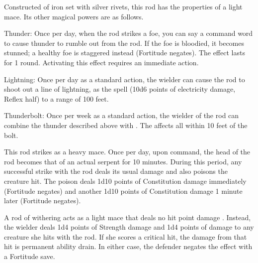 
 Constructed of iron set with silver rivets, this rod has the properties of a  light mace. Its other magical powers are as follows.
\begin{itemize*}
\item Thunder: Once per day, when the rod strikes a foe, you can say a command word to cause thunder to rumble out from the rod. If the foe is bloodied, it becomes stunned; a healthy foe is staggered instead (Fortitude negates). The effect lasts for 1 round. Activating this effect requires an immediate action.
\item Lightning: Once per day as a standard action, the wielder can cause the rod to shoot out a line of lightning, as the  spell (10d6 points of electricity damage, Reflex half) to a range of 100 feet.
\item Thunderbolt: Once per week as a standard action, the wielder of the rod can combine the thunder described above with . The  affects all within 10 feet of the bolt.
\end{itemize*}


 This rod strikes as a  heavy mace. Once per day, upon command, the head of the rod becomes that of an actual serpent for 10 minutes. During this period, any successful strike with the rod deals its usual damage and also poisons the creature hit. The poison deals 1d10 points of Constitution damage immediately (Fortitude negates) and another 1d10 points of Constitution damage 1 minute later (Fortitude negates).


 A rod of withering acts as a  light mace that deals no hit point damage . Instead, the wielder deals 1d4 points of Strength damage and 1d4 points of  damage to any creature she hits with the rod. If she scores a critical hit, the damage from that hit is permanent ability drain. In either case, the defender negates the effect with a Fortitude save.

